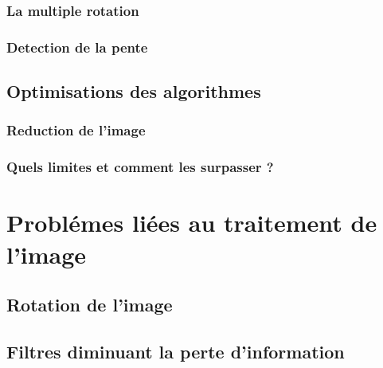 \subsection{ La multiple rotation }
\subsection{ Detection de la pente }
\section{ Optimisations des algorithmes }
\subsection{ Reduction de l'image }
\subsection{ Quels limites et comment les surpasser ? }
\chapter{ Probl\'emes li\'ees au traitement de l'image }
\section{ Rotation de l'image}
\section{ Filtres diminuant la perte d'information}






